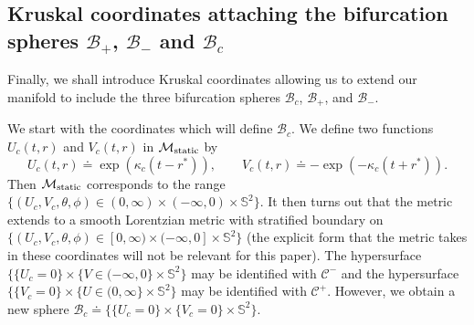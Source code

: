 \documentclass[A4,10pt]{article}
\begin{document}

\subsection{Kruskal coordinates  attaching the bifurcation spheres $\mathcal{B}_+$, $\mathcal{B}_-$ and $\mathcal{B}_c$}\label{krusky}

Finally, we shall introduce Kruskal coordinates allowing us to extend our manifold to
include the three bifurcation spheres $\mathcal{B}_c$, $\mathcal{B}_+$, and $\mathcal{B}_-$. 


We start with the coordinates which will define $\mathcal{B}_c$. We define two functions $U_c(t,r)$ and $V_c(t,r)$ in $\mathcal{M}_{{\rm static}}$ by
\[
U_c\left(t,r\right) \doteq \exp\left(\kappa_c\left(t-r^*\right)\right),\qquad V_c\left(t,r\right) \doteq -\exp\left(-\kappa_c\left(t+r^*\right)\right).
\]
Then $\mathcal{M}_{{\rm static}}$ corresponds to the range $\{(U_c,V_c,\theta,\phi) \in (0,\infty)\times (-\infty,0) \times \mathbb{S}^2\}$. It then turns out that the metric extends to a smooth Lorentzian metric with stratified boundary on $\{(U_c,V_c,\theta,\phi) \in [0,\infty)\times (-\infty,0] \times \mathbb{S}^2\}$ (the explicit form that the metric takes in these coordinates  will not be relevant for this paper). The hypersurface $\{\{U_c = 0\} \times \{V \in (-\infty,0\} \times \mathbb{S}^2\}$ may be identified with $\mathcal{C}^-$ and the hypersurface $\{\{V_c = 0\} \times \{U \in (0,\infty\} \times \mathbb{S}^2\}$ may be identified with $\mathcal{C}^+$. However, we obtain a new sphere $\mathcal{B}_c \doteq \{\{U_c = 0\} \times \{V_c = 0\} \times \mathbb{S}^2\}$.
\end{document}
